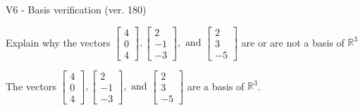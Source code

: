 \begin{exercise}
  \begin{exerciseTitle}V6 - Basis verification (ver. 180)\end{exerciseTitle}
  \begin{exerciseStatement}
    Explain why the vectors \(\left[\begin{array}{r}
4 \\
0 \\
4
\end{array}\right] , \left[\begin{array}{r}
2 \\
-1 \\
-3
\end{array}\right] , \text{ and } \left[\begin{array}{r}
2 \\
3 \\
-5
\end{array}\right]\) are or are not a basis of \(\mathbb{R}^3\)	


  \end{exerciseStatement}
  \begin{exerciseAnswer}
   The vectors \(\left[\begin{array}{r}
4 \\
0 \\
4
\end{array}\right] , \left[\begin{array}{r}
2 \\
-1 \\
-3
\end{array}\right] , \text{ and } \left[\begin{array}{r}
2 \\
3 \\
-5
\end{array}\right]\) 
  	 are  a basis of \(\mathbb{R}^3\).
  


  \end{exerciseAnswer}
\end{exercise}